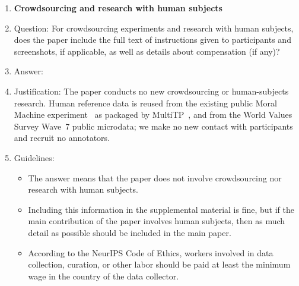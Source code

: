 \begin{enumerate}
\item {\bf Crowdsourcing and research with human subjects}
    \item[] Question: For crowdsourcing experiments and research with human subjects, does the paper include the full text of instructions given to participants and screenshots, if applicable, as well as details about compensation (if any)?
    \item[] Answer: \answerNA{}
    \item[] Justification: The paper conducts no new crowdsourcing or human-subjects research. Human reference data is reused from the existing public Moral Machine experiment~\citep{awad2018moral} as packaged by MultiTP~\citep{jin2025multitp}, and from the World Values Survey Wave~7 public microdata; we make no new contact with participants and recruit no annotators.
    \item[] Guidelines:
    \begin{itemize}
        \item The answer \answerNA{} means that the paper does not involve crowdsourcing nor research with human subjects.
        \item Including this information in the supplemental material is fine, but if the main contribution of the paper involves human subjects, then as much detail as possible should be included in the main paper. 
        \item According to the NeurIPS Code of Ethics, workers involved in data collection, curation, or other labor should be paid at least the minimum wage in the country of the data collector. 
    \end{itemize}


\end{enumerate}
